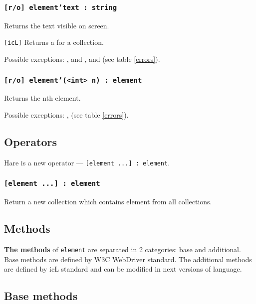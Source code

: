 \subsubsection{\texttt{[r/o] element'text : string}}

Returns the text visible on screen.

\texttt{[icL]} Returns a \listtype{} for a collection.

Possible exceptions: ,  and ,  and  (see table \ref{errors}).

\subsubsection{\texttt{[r/o] element'(<int> n) : element}}

Returns the nth element.

Possible exceptions: ,  (see table \ref{errors}).

\subsection{Operators}

Hare is a new operator — \texttt{[element ...] : element}.

\subsubsection{\texttt{[element ...] : element}}

Return a new collection which contains element from all collections.

\subsection{Methods}

{\bf The methods} of \texttt{element} are separated in 2 categories: base and additional. Base methods are defined by W3C WebDriver standard. The additional methods are defined by icL standard and can be modified in next versions of language.

\subsection{Base methods}


